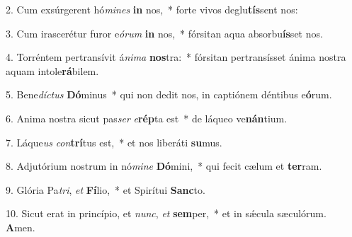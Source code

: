 2. Cum exsúrgerent hó\textit{mi}\textit{nes} \textbf{in} nos,~*  forte vivos deglu\textbf{tís}sent nos:\

3. Cum irascerétur furor e\textit{ó}\textit{rum} \textbf{in} nos,~*  fórsitan aqua absorbu\textbf{ís}set nos.\

4. Torréntem pertransívit á\textit{ni}\textit{ma} \textbf{nos}tra:~*  fórsitan pertransísset ánima nostra aquam intole\textbf{rá}bilem.\

5. Bene\textit{díc}\textit{tus} \textbf{Dó}minus~*  qui non dedit nos, in captiónem déntibus e\textbf{ó}rum.\

6. Anima nostra sicut pas\textit{ser} \textit{e}\textbf{rép}ta est~*  de láqueo ve\textbf{nán}tium.\

7. Láque\textit{us} \textit{con}\textbf{trí}tus est,~*  et nos liberáti \textbf{su}mus.\

8. Adjutórium nostrum in nó\textit{mi}\textit{ne} \textbf{Dó}mini,~*  qui fecit cælum et \textbf{ter}ram.\

9. Glória Pa\textit{tri}, \textit{et} \textbf{Fí}lio,~*  et Spirítui \textbf{Sanc}to.\

10. Sicut erat in princípio, et \textit{nunc}, \textit{et} \textbf{sem}per,~*  et in sǽcula sæculórum. \textbf{A}men.\

